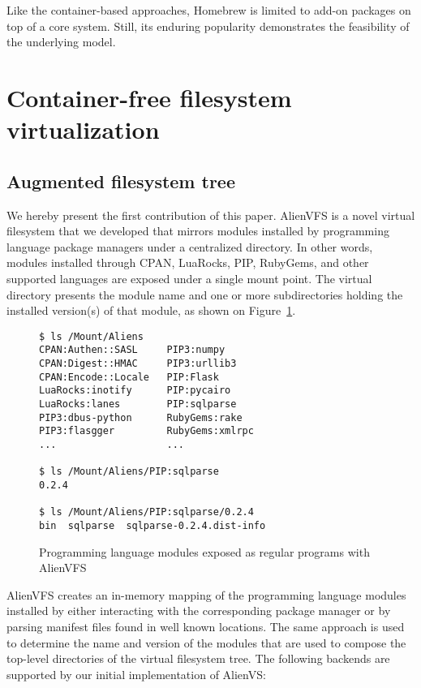 \documentclass[sigplan, anonymous, 10pt]{acmart}
\begin{document}
Like the container-based approaches, Homebrew is limited to add-on packages on top of
a core system. Still, its enduring popularity demonstrates the feasibility of the
underlying model.

\section{Container-free filesystem virtualization}

\subsection{Augmented filesystem tree}
We hereby present the first contribution of this paper. AlienVFS is a novel virtual
filesystem that we developed that mirrors modules installed by programming language
package managers under a centralized directory. In other words, modules installed
through CPAN, LuaRocks, PIP, RubyGems, and other supported languages are exposed under
a single mount point. The virtual directory presents the module name and one or more
subdirectories holding the installed version(s) of that module, as shown on
Figure~\ref{fig:alienvfs}.

\begin{figure}
    \begin{Verbatim}[frame=single]
$ ls /Mount/Aliens
CPAN:Authen::SASL     PIP3:numpy
CPAN:Digest::HMAC     PIP3:urllib3
CPAN:Encode::Locale   PIP:Flask
LuaRocks:inotify      PIP:pycairo
LuaRocks:lanes        PIP:sqlparse
PIP3:dbus-python      RubyGems:rake
PIP3:flasgger         RubyGems:xmlrpc
...                   ...

$ ls /Mount/Aliens/PIP:sqlparse
0.2.4

$ ls /Mount/Aliens/PIP:sqlparse/0.2.4
bin  sqlparse  sqlparse-0.2.4.dist-info
    \end{Verbatim}
    \caption{Programming language modules exposed as regular programs with AlienVFS}
    \label{fig:alienvfs}
\end{figure}

AlienVFS creates an in-memory mapping of the programming language modules installed
by either interacting with the corresponding package manager or by parsing manifest
files found in well known locations. The same approach is used to determine the
name and version of the modules that are used to compose the top-level directories
of the virtual filesystem tree. The following backends are supported by our initial
implementation of AlienVS:
\end{document}
